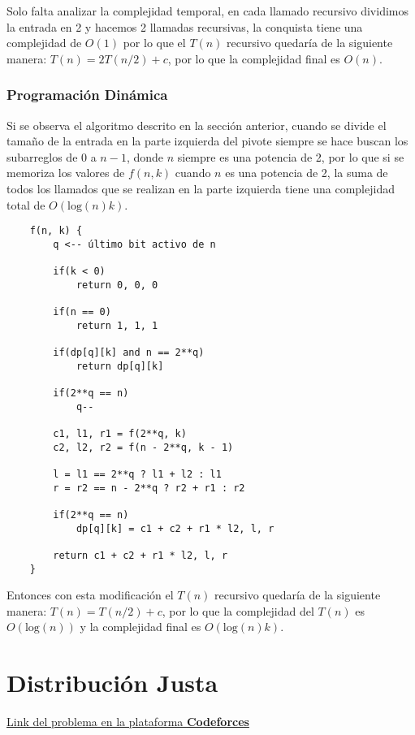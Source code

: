 \documentclass{article}
\begin{document}
Solo falta analizar la complejidad temporal, en cada llamado recursivo dividimos la entrada en 2 y hacemos 2 llamadas recursivas,
la conquista tiene una complejidad de $O(1)$ por lo que el $T(n)$ recursivo quedaría de la siguiente manera: $T(n) = 2T(n/2) + c$,
por lo que la complejidad final es $O(n)$.

\subsubsection{Programación Dinámica}

Si se observa el algoritmo descrito en la sección anterior, cuando se divide el tamaño de la entrada en la parte izquierda del pivote
siempre se hace buscan los subarreglos de 0 a $n-1$, donde $n$ siempre es una potencia de 2, por lo que si se memoriza los valores de
$f(n,k)$ cuando $n$ es una potencia de 2, la suma de todos los llamados que se realizan en la parte izquierda tiene una complejidad total
de $O(\text{log}(n)k)$.

\begin{verbatim}
    f(n, k) {
        q <-- último bit activo de n 

        if(k < 0)
            return 0, 0, 0

        if(n == 0)
            return 1, 1, 1

        if(dp[q][k] and n == 2**q)
            return dp[q][k]

        if(2**q == n) 
            q--

        c1, l1, r1 = f(2**q, k)
        c2, l2, r2 = f(n - 2**q, k - 1)

        l = l1 == 2**q ? l1 + l2 : l1
        r = r2 == n - 2**q ? r2 + r1 : r2

        if(2**q == n)
            dp[q][k] = c1 + c2 + r1 * l2, l, r  
        
        return c1 + c2 + r1 * l2, l, r 
    }
\end{verbatim}

Entonces con esta modificación el $T(n)$ recursivo quedaría de la siguiente manera: $T(n) = T(n/2) + c$,
por lo que la complejidad del $T(n)$ es $O(\text{log}(n))$ y la complejidad final es $O(\text{log}(n)k)$.

\section{Distribución Justa}

\href{https://codeforces.com/gym/105053/problem/F}{Link del problema en la plataforma \textbf{Codeforces}}
\end{document}
